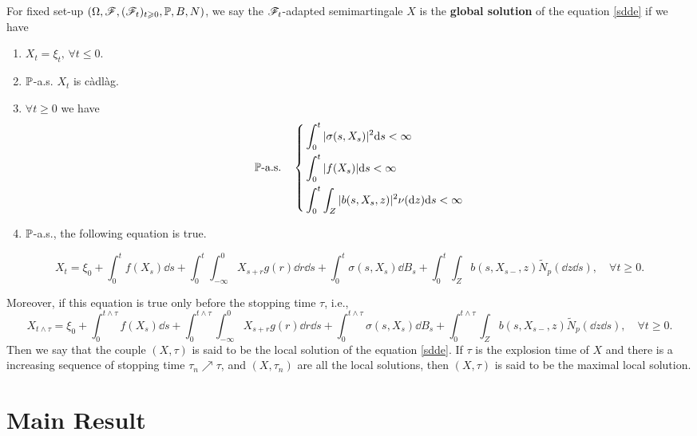 \documentclass[8pt,onesided]{article}
\begin{document}
\begin{definition}
 For fixed set-up $(\Omega,\mathscr{F}, (\mathscr{F}_t )_{t\geqslant 0},\mathbb{P},B,N)$, we say the $\mathscr{F}_t$-adapted semimartingale $X$ is the \textbf{global solution} of the equation \ref{sdde} if we have
\begin{enumerate}
    \item $X_t=\xi_t,\,\forall t\le 0$.
    \item $\mathbb{P}$-a.s. $X_t$ is càdlàg.
    \item $\forall t\ge 0$ we have
\begin{equation*}
    \mathbb{P}\text{-a.s.} \quad \left\{
    \begin{aligned}
        &\int_0^t |\sigma(s,X_s)|^2 \dd s<\infty\\
       & \int_0^t |f(X_s)| \dd s<\infty\\
       & \int_0^t \int_Z |b(s,X_s,z)|^2 \nu(\dd z)\dd s<\infty\\
    \end{aligned}
    \right.
\end{equation*}
    \item $\mathbb{P}$-a.s., the following equation is true.
\end{enumerate}
\begin{equation*}
    X_t= \xi_0+\int_0^t f(X_s)\dd s +\int_0^t \int_{-\infty}^0 X_{s+r} g(r)\dd r \dd s +\int_0^t \sigma(s, X_s)\dd B_s +\int_0^t \int_Z b(s, X_{s-},z)\tilde N_p(\dd z \dd s), \quad \forall t\ge0.
\end{equation*}

Moreover, if this equation is true only before the stopping time $\tau$, i.e.,
\begin{equation*}
    X_{t\wedge\tau}= \xi_0+\int_0^{t\wedge\tau} f(X_s)\dd s +\int_0^{t\wedge\tau} \int_{-\infty}^0 X_{s+r} g(r)\dd r \dd s +\int_0^{t\wedge\tau} \sigma(s, X_s)\dd B_s +\int_0^{t\wedge\tau} \int_Z b(s, X_{s-},z)\tilde N_p(\dd z \dd s), \quad \forall  t\ge0.
\end{equation*}
Then we say that the couple $(X,\tau )$ is said to be the local solution of the equation \ref{sdde}. If $\tau$ is the explosion time of $X$ and there is a increasing sequence of stopping time $\tau_n\nearrow \tau$, and $(X,\tau_n)$ are all the local solutions, then $(X,\tau)$ is said to be the maximal local solution.
\end{definition}


\section{Main Result}
\label{ss3}
\end{document}
